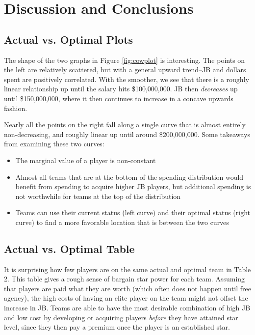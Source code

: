 \documentclass{article}
\begin{document}
%

\section{Discussion and Conclusions}

\subsection{Actual vs. Optimal Plots}

The shape of the two graphs in Figure \ref{fig:cowplot} is interesting. The points on the left are relatively scattered, but with a general upward trend--JB and dollars spent are positively correlated. With the smoother, we see that there is a roughly linear relationship up until the salary hits \$100,000,000. JB then \emph{decreases} up until \$150,000,000, where it then continues to increase in a concave upwards fashion.

Nearly all the points on the right fall along a single curve that is almost entirely non-decreasing, and roughly linear up until around \$200,000,000. Some takeaways from examining these two curves:
\begin{singlespace}
\begin{itemize}
	\item{The marginal value of a player is non-constant}
	\item{Almost all teams that are at the bottom of the spending distribution would benefit from spending to acquire higher JB players, but additional spending is not worthwhile for teams at the top of the distribution}
	\item{Teams can use their current status (left curve) and their optimal status (right curve) to find a more favorable location that is between the two curves}
\end{itemize}
\end{singlespace}

\subsection{Actual vs. Optimal Table}

It is surprising how few players are on the same actual and optimal team in Table 2. This table gives a rough sense of bargain star power for each team. Assuming that players are paid what they are worth (which often does not happen until free agency), the high costs of having an elite player on the team might not offset the increase in JB. Teams are able to have the most desirable combination of high JB and low cost by developing or acquiring players \emph{before} they have attained star level, since they then pay a premium once the player is an established star. 
\end{document}
